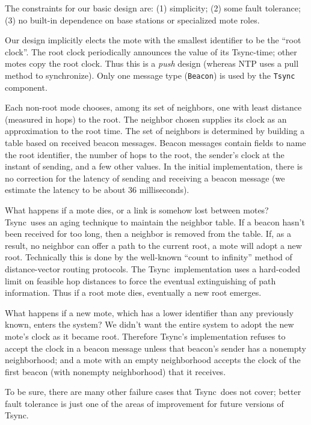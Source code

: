 \documentclass[11pt]{article}
\def\Tsync{\textsf{Tsync}}
\begin{document}
The constraints for our basic design are:  (1) simplicity;  
(2) some fault tolerance;  (3) no built-in dependence on base stations
or specialized mote roles.  
\par
Our design implicitly elects the mote with the smallest identifier
to be the ``root clock''.  The root clock periodically announces the
value of its \Tsync-time; other motes copy the root clock.  Thus
this is a \emph{push} design (whereas NTP uses a pull method to 
synchronize).  Only one message type (\texttt{Beacon}) is used
by the \texttt{Tsync} component.
\par
Each non-root mode chooses, among its set of neighbors, one with
least distance (measured in hops) to the root.  The neighbor chosen
supplies its clock as an approximation to the root time.  The set of
neighbors is determined by building a table based on received 
beacon messages.  Beacon messages contain fields to name the root
identifier, the number of hops to the root, the sender's clock at
the instant of sending, and a few other values.  In the initial
implementation, there is no correction for the latency of sending
and receiving a beacon message (we estimate the latency to be
about 36 milliseconds).
\par
What happens if a mote dies, or a link is somehow lost between
motes?  \Tsync\ uses an aging technique to maintain the neighbor
table.  If a beacon hasn't been received for too long, then a 
neighbor is removed from the table.  If, as a result, no neighbor
can offer a path to the current root, a mote will adopt a new
root.  Technically this is done by the well-known ``count to 
infinity'' method of distance-vector routing protocols.  The 
\Tsync\ implementation uses a hard-coded limit on feasible hop
distances to force the eventual extinguishing of path information.
Thus if a root mote dies, eventually a new root emerges.  
\par
What happens if a new mote, which has a lower identifier than
any previously known, enters the system?  We didn't want the 
entire system to adopt the new mote's clock as it became root.
Therefore \Tsync's implementation refuses to accept the clock
in a beacon message unless that beacon's sender has a nonempty
neighborhood;  and a mote with an empty neighborhood accepts the
clock of the first beacon (with nonempty neighborhood) that it
receives.
\par
To be sure, there are many other failure cases that \Tsync\ 
does not cover;  better fault tolerance is just one of the
areas of improvement for future versions of \Tsync.
\end{document}
